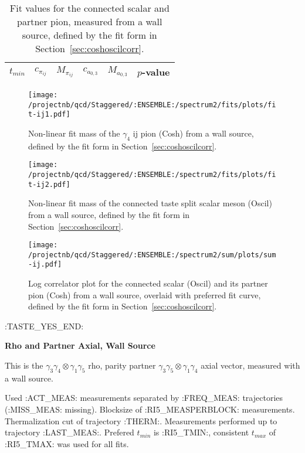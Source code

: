 \begin{table}[ht!]
\centering
\scriptsize
\begin{tabular}{|c|c|c|c|c|c|}
\hline
 $t_{min}$ & $c_{\pi_{ij}}$ &  $M_{\pi_{ij}}$ & $c_{a_{0,3}}$ & $M_{a_{0,3}}$ & $p$-value \\
\hline

\end{tabular}
\caption{Fit values for the connected scalar and partner pion, measured from a wall source, defined by the fit form in Section~\ref{sec:coshoscilcorr}.}
\end{table}


\begin{multicols}{2}
\begin{figure}[H]
\centering
\texttt{[image: /projectnb/qcd/Staggered/:ENSEMBLE:/spectrum2/fits/plots/fit-ij1.pdf]}
\caption{Non-linear fit mass of the $\gamma_4$ ij pion (Cosh) from a wall source, defined by the fit form in Section~\ref{sec:coshoscilcorr}.}
\end{figure}
\columnbreak
\begin{figure}[H]
\centering
\texttt{[image: /projectnb/qcd/Staggered/:ENSEMBLE:/spectrum2/fits/plots/fit-ij2.pdf]}
\caption{Non-linear fit mass of the connected taste split scalar meson (Oscil) from a wall source, defined by the fit form in Section~\ref{sec:coshoscilcorr}.}
\end{figure}
\end{multicols}

\begin{figure}[H]
\centering
\texttt{[image: /projectnb/qcd/Staggered/:ENSEMBLE:/spectrum2/sum/plots/sum-ij.pdf]}
\caption{Log correlator plot for the connected scalar (Oscil) and its partner pion (Cosh) from a wall source, overlaid with preferred fit curve, defined by the fit form in Section~\ref{sec:coshoscilcorr}.}
\end{figure}

\clearpage
:TASTE_YES_END:

\centerline{\textbf{Rho and Partner Axial, Wall Source}}

This is the $\gamma_3 \gamma_4 \otimes \gamma_1 \gamma_5$ rho, parity partner $\gamma_3 \gamma_5 \otimes \gamma_1 \gamma_4$ axial vector, measured with a wall source. 

{\small{Used :ACT_MEAS: measurements separated by :FREQ_MEAS: trajectories (:MISS_MEAS: missing). Blocksize of :RI5_MEASPERBLOCK: measurements. Thermalization cut of trajectory :THERM:. Measurements performed up to trajectory :LAST_MEAS:. Prefered $t_{min}$ is :RI5_TMIN:, consistent $t_{max}$ of :RI5_TMAX: was used for all fits.}}



